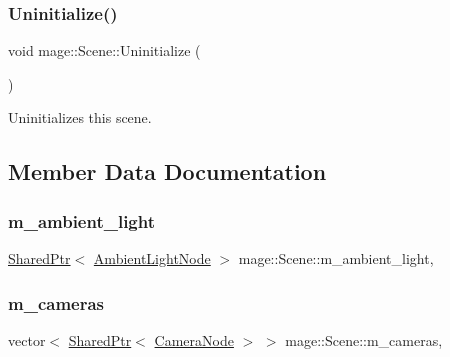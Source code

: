 \hypertarget{classmage_1_1_scene_a714dc33c04dc2b8e2cec93564905b174}{}\label{classmage_1_1_scene_a714dc33c04dc2b8e2cec93564905b174} 
\subsubsection{\texorpdfstring{Uninitialize()}{Uninitialize()}}
{\footnotesize\ttfamily void mage\+::\+Scene\+::\+Uninitialize (\begin{DoxyParamCaption}{ }\end{DoxyParamCaption})}

Uninitializes this scene. 

\subsection{Member Data Documentation}
\hypertarget{classmage_1_1_scene_a0ce9718f4b0137a52b858a29d3504328}{}\label{classmage_1_1_scene_a0ce9718f4b0137a52b858a29d3504328} 
\subsubsection{\texorpdfstring{m\+\_\+ambient\+\_\+light}{m\_ambient\_light}}
{\footnotesize\ttfamily \hyperlink{namespacemage_a1e01ae66713838a7a67d30e44c67703e}{Shared\+Ptr}$<$ \hyperlink{namespacemage_ab0783a7428706251f8561dc30a4d228d}{Ambient\+Light\+Node} $>$ mage\+::\+Scene\+::m\+\_\+ambient\+\_\+light\hspace{0.3cm}{\ttfamily [mutable]}, {\ttfamily [private]}}

\hypertarget{classmage_1_1_scene_a76fc089ae3185c82702d2ca42fd820e7}{}\label{classmage_1_1_scene_a76fc089ae3185c82702d2ca42fd820e7} 
\subsubsection{\texorpdfstring{m\+\_\+cameras}{m\_cameras}}
{\footnotesize\ttfamily vector$<$ \hyperlink{namespacemage_a1e01ae66713838a7a67d30e44c67703e}{Shared\+Ptr}$<$ \hyperlink{classmage_1_1_camera_node}{Camera\+Node} $>$ $>$ mage\+::\+Scene\+::m\+\_\+cameras\hspace{0.3cm}{\ttfamily [mutable]}, {\ttfamily [private]}}

